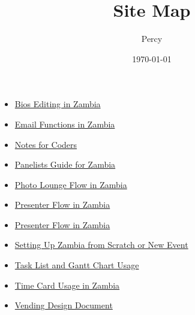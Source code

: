 \documentclass{article}
\author{Percy}
\date{\today}
\title{Site Map}
\begin{document}
\maketitle
\tableofcontents

\begin{itemize}
\item \href{Bio_Editing.org}{Bios Editing in Zambia} \\
\item \href{Email_Functions.org}{Email Functions in Zambia} \\
\item \href{NotesForCoders.org}{Notes for Coders} \\
\item \href{Panelists_Guide.org}{Panelists Guide for Zambia} \\
\item \href{Photo_Lounge.org}{Photo Lounge Flow in Zambia} \\
\item \href{Publication_Flow.org}{Presenter Flow in Zambia} \\
\item \href{Presenter_Flow.org}{Presenter Flow in Zambia} \\
\item \href{Setting_Up.org}{Setting Up Zambia from Scratch or New Event} \\
\item \href{Tasks-Gantt_Chart.org}{Task List and Gantt Chart Usage} \\
\item \href{Time_Card.org}{Time Card Usage in Zambia} \\
\item \href{Vending_Design_Document.org}{Vending Design Document} \\
\end{itemize}
\end{document}
